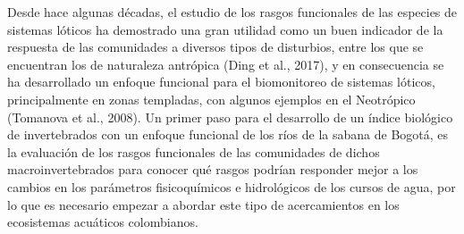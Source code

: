 \documentclass[12pt, letterpaper]{article}
\begin{document}
Desde hace algunas décadas, el estudio de los rasgos funcionales de las especies de sistemas lóticos ha demostrado 
una gran utilidad como un buen indicador de la respuesta de las comunidades a diversos tipos de disturbios, entre 
los que se encuentran los de naturaleza antrópica (Ding et al., 2017), y en consecuencia se ha desarrollado un enfoque
funcional para el biomonitoreo de sistemas lóticos, principalmente en zonas templadas, con algunos ejemplos en el 
Neotrópico (Tomanova et al., 2008). Un primer paso para el desarrollo de un índice biológico de invertebrados con
un enfoque funcional de los ríos de la sabana de Bogotá, es la evaluación de los rasgos funcionales de las comunidades
de dichos macroinvertebrados para conocer qué rasgos podrían responder mejor a los cambios en los parámetros
fisicoquímicos e hidrológicos de los cursos de agua, por lo que es necesario empezar a abordar este tipo
de acercamientos en los ecosistemas acuáticos colombianos.

\begin{comment}
 Objetivos: 
 -Evaluar la respuesta de los rasgos funcionales y de la diversidad funcional
  de las comunidades de macroinvertebrados a la variación en la calidad 
  del agua en dos ríos de la Sabana de Bogotá.

 -Establecer los rasgos funcionales de las comunidades de macroinvertebrados
  que reflejen mejor los cambios físicos, químicos e hidrológicos de los ríos
  Neusa y Frío.

 -Comparar la respuesta de los rasgos funcionales de los macroinvertebrados 
  ante los cambios en las variables fisicoquímicas del agua con la obtenida 
  por medio de otras variables tradicionalmente medidas en dichos indicadores
  biológicos.
\end{comment}
\end{document}
